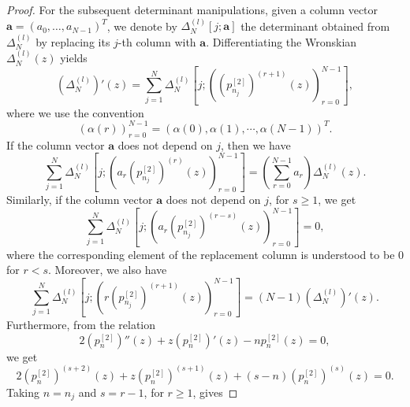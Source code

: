 \documentclass[preprint,3p,10pt]{elsarticle}
\theoremstyle{definition}
\begin{document}
\begin{proof}
For the subsequent determinant manipulations, given a column vector \(\mathbf{a}=(a_0,\ldots,a_{N-1})^T\), we denote by
\(\Delta_N^{(l)}[j;\mathbf{a}]\) the determinant obtained from \(\Delta_N^{(l)}\) by replacing its \(j\)-th column with \(\mathbf{a}\). Differentiating the Wronskian \(\Delta_N^{(l)}(z)\) yields 
\begin{equation}
\label{eq:k4-column-derivative-rule}
    \left(\Delta_N^{(l)}\right)'(z)=\sum_{j=1}^{N}
    \Delta_N^{(l)}\!\left[j;\left(\left(p_{n_j}^{[2]}\right)^{(r+1)}(z)\right)_{r=0}^{N-1}\right],
\end{equation}
where we use the convention
\begin{equation}
    \left(\alpha\left(r\right)\right)_{r=0}^{N-1}= \left(\alpha(0),\alpha(1),\cdots,\alpha(N-1)\right)^T.
\end{equation}
If the column vector \(\mathbf{a}\) does not depend on \(j\), then we have
\begin{equation}
\label{eq:k4-diagonal-row-rule}
    \sum_{j=1}^{N}
    \Delta_N^{(l)}\!\left[j;\left(a_r\left(p_{n_j}^{[2]}\right)^{(r)}(z)\right)_{r=0}^{N-1}\right]
    =
    \left(\sum_{r=0}^{N-1}a_r\right)\Delta_N^{(l)}(z).
\end{equation}
Similarly, if the column vector \(\mathbf{a}\) does not depend on \(j\), for \(s\geq1\), we get
\begin{equation}
\label{eq:k4-lower-row-rule}
    \sum_{j=1}^{N}
    \Delta_N^{(l)}\!\left[j;\left(a_r\left(p_{n_j}^{[2]}\right)^{(r-s)}(z)\right)_{r=0}^{N-1}\right]
    =
    0,
\end{equation}
where the corresponding element of the
replacement column is understood to be $0$ for $r<s$. Moreover, we also have
\begin{equation}
\label{eq:k4-r-upper-row-rule}
    \sum_{j=1}^{N}
    \Delta_N^{(l)}\!\left[j;\left(r\left(p_{n_j}^{[2]}\right)^{(r+1)}(z)\right)_{r=0}^{N-1}\right]
    =
    (N-1)\left(\Delta_N^{(l)}\right)'(z).
\end{equation}
Furthermore, from the relation
\begin{equation}
    2\left(p_n^{[2]}\right)''(z)+z\left(p_n^{[2]}\right)'(z)-np_n^{[2]}(z)=0,
\end{equation}
we get
\begin{equation}
\label{eq:k4-differentiated-Hermite-corrected}
    2\left(p_n^{[2]}\right)^{(s+2)}(z)
    +z\left(p_n^{[2]}\right)^{(s+1)}(z)
    +(s-n)\left(p_n^{[2]}\right)^{(s)}(z)
    =
    0.
\end{equation}
Taking \(n=n_j\) and \(s=r-1\), for \(r\geq1\), gives

\end{proof}
\end{document}
